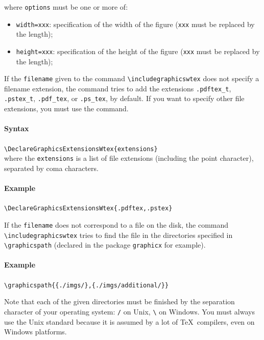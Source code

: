 \documentclass[book,taskpackage,specpackage,codepackage]{upmethodology-document}
\begin{document}
where \texttt{options} must be one or more of: \begin{itemize}
\item \texttt{width=xxx}: specification of the width of the figure (\texttt{xxx} must be replaced by the length);
\item \texttt{height=xxx}: specification of the height of the figure (\texttt{xxx} must be replaced by the length);
\end{itemize}

If the \texttt{filename} given to the command \texttt{{\textbackslash}includegraphicswtex} does not specify a filename extension, the command tries to add the extensions \texttt{.pdftex\_t}, \texttt{.pstex\_t}, \texttt{.pdf\_tex}, or \texttt{.ps\_tex}, by default. If you want to specify other file extensions, you must use the command.

\paragraph{Syntax} \texttt{{\textbackslash}DeclareGraphicsExtensionsWtex\{extensions\}} \\
where the \texttt{extensions} is a list of file extensions (including the point character), separated by coma characters.

\paragraph{Example} \texttt{{\textbackslash}DeclareGraphicsExtensionsWtex\{.pdftex,.pstex\}}

If the \texttt{filename} does not correspond to a file on the disk, the command \texttt{{\textbackslash}includegraphicswtex} tries to find the file in the directories specified in \texttt{{\textbackslash}graphicspath} (declared in the package \texttt{graphicx} for example). \\

\paragraph{Example} \texttt{{\textbackslash}graphicspath\{\{./imgs/\},\{./imgs/additional/\}\}} \\

\begin{upminfo}
	Note that each of the given directories must be finished by the separation character of your operating system: \texttt{/} on Unix, \texttt{\textbackslash} on Windows. You must always use the Unix standard because it is assumed by a lot of \TeX\ compilers, even on Windows platforms.
\end{upminfo}
\end{document}
